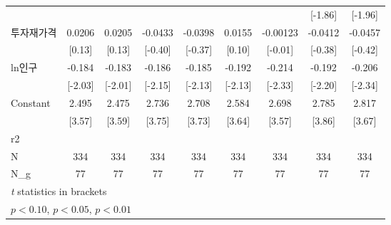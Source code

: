 \begin{table}[htbp]
{\begin{tabular}{l*{8}{c}}
                    &                     &                     &                     &                     &                     &                     &     [-1.86]         &     [-1.96]         \\
\addlinespace
투자재가격        &      0.0206         &      0.0205         &     -0.0433         &     -0.0398         &      0.0155         &    -0.00123         &     -0.0412         &     -0.0457         \\
                    &      [0.13]         &      [0.13]         &     [-0.40]         &     [-0.37]         &      [0.10]         &     [-0.01]         &     [-0.38]         &     [-0.42]         \\
\addlinespace
ln인구            &      -0.184\sym{**} &      -0.183\sym{**} &      -0.186\sym{**} &      -0.185\sym{**} &      -0.192\sym{**} &      -0.214\sym{**} &      -0.192\sym{**} &      -0.206\sym{**} \\
                    &     [-2.03]         &     [-2.01]         &     [-2.15]         &     [-2.13]         &     [-2.13]         &     [-2.33]         &     [-2.20]         &     [-2.34]         \\
\addlinespace
Constant            &       2.495\sym{***}&       2.475\sym{***}&       2.736\sym{***}&       2.708\sym{***}&       2.584\sym{***}&       2.698\sym{***}&       2.785\sym{***}&       2.817\sym{***}\\
                    &      [3.57]         &      [3.59]         &      [3.75]         &      [3.73]         &      [3.64]         &      [3.57]         &      [3.86]         &      [3.67]         \\
\midrule
r2                  &                     &                     &                     &                     &                     &                     &                     &                     \\
N                   &         334         &         334         &         334         &         334         &         334         &         334         &         334         &         334         \\
N\_g                 &          77         &          77         &          77         &          77         &          77         &          77         &          77         &          77         \\
\bottomrule
\multicolumn{9}{l}{\footnotesize \textit{t} statistics in brackets}\\
\multicolumn{9}{l}{\footnotesize \sym{*} \(p<0.10\), \sym{**} \(p<0.05\), \sym{***} \(p<0.01\)}\\
\end{tabular}}
\end{table}
